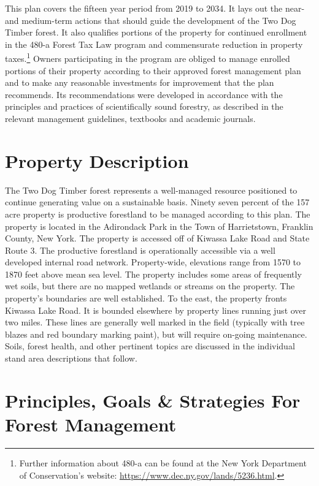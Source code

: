 \documentclass[]{tufte-handout}
\begin{document}
This plan covers the fifteen year period from 2019 to 2034. It lays out
the near- and medium-term actions that should guide the development of
the Two Dog Timber forest. It also qualifies portions of the property
for continued enrollment in the 480-a Forest Tax Law program and
commensurate reduction in property taxes.\footnote{Further information
  about 480-a can be found at the New York Department of Conservation's
  website: \url{https://www.dec.ny.gov/lands/5236.html}. \vspace{20pt}}
Owners participating in the program are obliged to manage enrolled
portions of their property according to their approved forest management
plan and to make any reasonable investments for improvement that the
plan recommends. Its recommendations were developed in accordance with
the principles and practices of scientifically sound forestry, as
described in the relevant management guidelines, textbooks and academic
journals.

\section{Property Description}\label{property-description}

The Two Dog Timber forest represents a well-managed resource positioned
to continue generating value on a sustainable basis. Ninety seven
percent of the 157 acre property is productive forestland to be managed
according to this plan. The property is located in the Adirondack Park
in the Town of Harrietstown, Franklin County, New York. The property is
accessed off of Kiwassa Lake Road and State Route 3. The productive
forestland is operationally accessible via a well developed internal
road network. Property-wide, elevations range from 1570 to 1870 feet
above mean sea level. The property includes some areas of frequently wet
soils, but there are no mapped wetlands or streams on the property. The
property's boundaries are well established. To the east, the property
fronts Kiwassa Lake Road. It is bounded elsewhere by property lines
running just over two miles. These lines are generally well marked in
the field (typically with tree blazes and red boundary marking paint),
but will require on-going maintenance. Soils, forest health, and other
pertinent topics are discussed in the individual stand area descriptions
that follow.

\section{Principles, Goals \& Strategies For Forest
Management}\label{principles-goals-strategies-for-forest-management}
\end{document}
